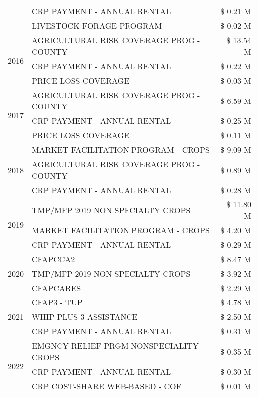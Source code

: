 \begin{tabular}{llr}
 & CRP PAYMENT - ANNUAL RENTAL & \$ 0.21 M \\
 & LIVESTOCK FORAGE PROGRAM & \$ 0.02 M \\
\cline{1-3}
\multirow[t]{3}{*}{2016} & AGRICULTURAL RISK COVERAGE PROG - COUNTY & \$ 13.54 M \\
 & CRP PAYMENT - ANNUAL RENTAL & \$ 0.22 M \\
 & PRICE LOSS COVERAGE & \$ 0.03 M \\
\cline{1-3}
\multirow[t]{3}{*}{2017} & AGRICULTURAL RISK COVERAGE PROG - COUNTY & \$ 6.59 M \\
 & CRP PAYMENT - ANNUAL RENTAL & \$ 0.25 M \\
 & PRICE LOSS COVERAGE & \$ 0.11 M \\
\cline{1-3}
\multirow[t]{3}{*}{2018} & MARKET FACILITATION PROGRAM - CROPS & \$ 9.09 M \\
 & AGRICULTURAL RISK COVERAGE PROG - COUNTY & \$ 0.89 M \\
 & CRP PAYMENT - ANNUAL RENTAL & \$ 0.28 M \\
\cline{1-3}
\multirow[t]{3}{*}{2019} & TMP/MFP 2019 NON SPECIALTY CROPS & \$ 11.80 M \\
 & MARKET FACILITATION PROGRAM - CROPS & \$ 4.20 M \\
 & CRP PAYMENT - ANNUAL RENTAL & \$ 0.29 M \\
\cline{1-3}
\multirow[t]{3}{*}{2020} & CFAPCCA2 & \$ 8.47 M \\
 & TMP/MFP 2019 NON SPECIALTY CROPS & \$ 3.92 M \\
 & CFAPCARES & \$ 2.29 M \\
\cline{1-3}
\multirow[t]{3}{*}{2021} & CFAP3 - TUP & \$ 4.78 M \\
 & WHIP PLUS 3 ASSISTANCE & \$ 2.50 M \\
 & CRP PAYMENT - ANNUAL RENTAL & \$ 0.31 M \\
\cline{1-3}
\multirow[t]{3}{*}{2022} & EMGNCY RELIEF PRGM-NONSPECIALITY CROPS & \$ 0.35 M \\
 & CRP PAYMENT - ANNUAL RENTAL & \$ 0.30 M \\
 & CRP COST-SHARE WEB-BASED - COF & \$ 0.01 M \\
\cline{1-3}
\bottomrule
\end{tabular}
